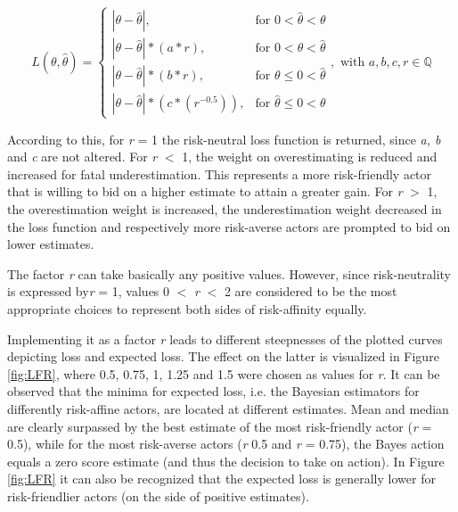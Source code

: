 	\begin{equation}\label{eq:LFR_final}
	L(\theta,\hat{\theta}) =
	\begin{cases}
	|\theta - \hat{\theta}|, & \text{for } 0<\hat{\theta}<\theta  \\
	|\theta-\hat{\theta}|*(a*r), & \text{for } 0<\theta<\hat{\theta} \\
	|\theta-\hat{\theta}|*(b*r), & \text{for } \theta\leq0<\hat{\theta} \\
	|\theta-\hat{\theta}|*(c*(r^{-0.5})), & \text{for } \hat{\theta}\leq0<\theta 
	\end{cases},
	\text{ with } a,b,c,r \in \mathbb{Q}
	\end{equation}
	
	According to this, for \textit{r} = 1 the risk-neutral loss function is returned, since \textit{a, b} and \textit{c} are not altered. For \textit{r} $<$ 1, the weight on overestimating is reduced and increased for fatal underestimation. This represents a more risk-friendly actor that is willing to bid on a higher estimate to attain a greater gain. For \textit{r} $>$ 1, the overestimation weight is increased, the underestimation weight decreased in the loss function and respectively more risk-averse actors are prompted to bid on lower estimates. 
	
	The factor \textit{r} can take basically any positive values. However, since risk-neutrality is expressed by\textit{r} = 1, values 0 $<$ \textit{r} $<$ 2 are considered to be the most appropriate choices to represent both sides of risk-affinity equally. 
	
	Implementing it as a factor \textit{r} leads to different steepnesses of the plotted curves depicting loss and expected loss. The effect on the latter is visualized in Figure \ref{fig:LFR}, where 0.5, 0.75, 1, 1.25 and 1.5 were chosen as values for \textit{r}. 	
	It can be observed that the minima for expected loss, i.e. the Bayesian estimators for differently risk-affine actors, are located at different estimates. Mean and median are clearly surpassed by the best estimate of the most risk-friendly actor (\textit{r} = 0.5), while for the most risk-averse actors (\textit{r} 0.5 and \textit{r} = 0.75), the Bayes action equals a zero score estimate (and thus the decision to take on action). In Figure \ref{fig:LFR} it can also be recognized that the expected loss is generally lower for risk-friendlier actors (on the side of positive estimates).
	
